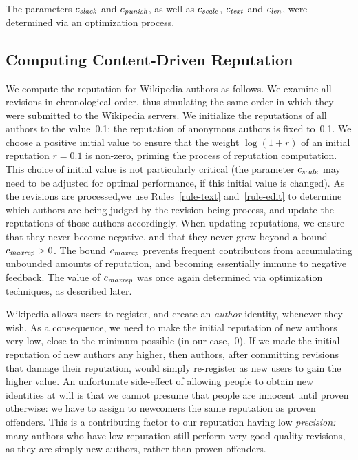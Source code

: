 The parameters ${c_{{\text{\textit{slack}}}}}$ and ${c_{{\text{\textit{punish}}}}}$, as well as ${c_{{\text{\textit{scale}}}}}$,
${c_{{\text{\textit{text}}}}}$ and ${c_{{\text{\textit{len}}}}}$, were determined via an optimization
process. 

\subsection{Computing Content-Driven Reputation}

We compute the reputation for Wikipedia authors as follows. 
We examine all revisions in chronological order, thus simulating the
same order in which they were submitted to the Wikipedia servers. 
We initialize the reputations of all authors to the value~0.1;
the reputation of anonymous authors is fixed to~0.1.  
We choose a positive initial value to ensure that the weight
$\log (1+r)$ of an initial reputation $r = 0.1$ is non-zero, priming
the process of reputation computation.  
This choice of initial value is not particularly critical (the
parameter ${c_{{\text{\textit{scale}}}}}$ may need to be adjusted for optimal performance,
if this initial value is changed). 
As the revisions are processed,we use Rules~\ref{rule-text}
and~\ref{rule-edit} to determine which authors are being
judged by the revision being process,
and update the reputations of those authors accordingly.
When updating reputations, we ensure that they never become negative,
and that they never grow beyond a bound ${c_{{\text{\textit{maxrep}}}}} > 0$. 
The bound ${c_{{\text{\textit{maxrep}}}}}$ prevents frequent contributors from
accumulating unbounded amounts of reputation, and becoming essentially
immune to negative feedback. 
The value of ${c_{{\text{\textit{maxrep}}}}}$ was once again determined via
optimization techniques, as described later.

Wikipedia allows users to register, and create an {\em author\/}
identity, whenever they wish. 
As a consequence, we need to make the initial reputation of new authors
very low, close to the minimum possible (in our case,~0). 
If we made the initial reputation of new authors any higher,
then authors, after committing revisions that damage their reputation,
would simply re-register as new users to gain the higher value. 
An unfortunate side-effect of allowing people to obtain new identities
at will is that we cannot presume that people are innocent until
proven otherwise: we have to assign to newcomers the same reputation
as proven offenders. 
This is a contributing factor to our reputation having low 
{\em precision:\/} many authors who have low reputation still perform
very good quality revisions, as they are simply new authors, rather than
proven offenders. 


